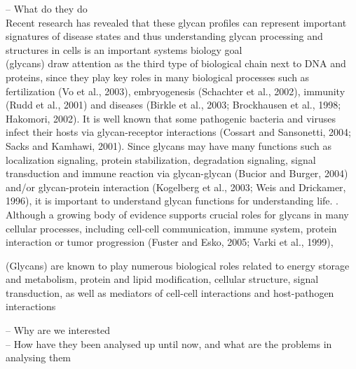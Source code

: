 \documentclass[12pt,a4paper]{article}
\begin{document}
-- What do they do\\

Recent research has revealed that these glycan profiles can represent important signatures of disease states and thus understanding glycan processing and structures in cells is an important systems biology goal \citep{10.1371/journal.pcbi.1002813}\\

(glycans) draw attention as the third type of biological chain next to DNA and proteins, since they play key roles in many biological processes such as fertilization (Vo et al., 2003), embryogenesis (Schachter et al., 2002), immunity (Rudd et al., 2001) and diseases (Birkle et al., 2003; Brockhausen et al., 1998; Hakomori, 2002). It is well known that some pathogenic bacteria and viruses infect their hosts via glycan-receptor interactions (Cossart and Sansonetti, 2004; Sacks and Kamhawi, 2001). Since glycans may have many functions such as localization signaling, protein stabilization, degradation signaling, signal transduction and immune reaction via glycan-glycan (Bucior and Burger, 2004) and/or glycan-protein interaction (Kogelberg et al., 2003; Weis and Drickamer, 1996), it is important to understand glycan functions for understanding life. \citep{doi:10.1093/bioinformatics/bti666}. \\

Although a growing body of evidence supports crucial roles for glycans in many cellular processes, including cell-cell communication, immune system, protein interaction or tumor progression (Fuster and Esko, 2005; Varki et al., 1999), \citep{doi:10.1093/bioinformatics/btm090}

(Glycans) are known to play numerous biological roles related to energy storage and metabolism, protein and lipid modification, cellular structure, signal transduction, as well as mediators of cell-cell interactions and host-pathogen interactions \citep{SONG2012137}


-- Why are we interested\\

-- How have they been analysed up until now, and what are the problems in analysing them\\
\end{document}
